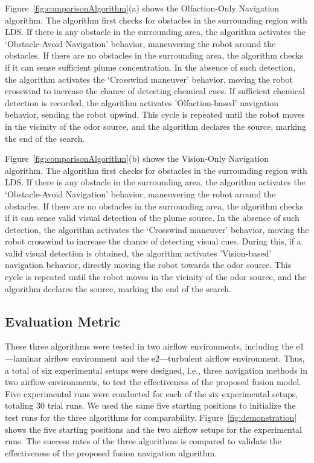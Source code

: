 Figure~\ref{fig:comparisonAlgorithm}(a) shows the Olfaction-Only Navigation algorithm. The algorithm first checks for obstacles in the surrounding region with LDS. If there is any obstacle in the surrounding area, the algorithm activates the `Obstacle-Avoid Navigation' behavior, maneuvering the robot around the obstacles. If there are no obstacles in the surrounding area, the algorithm checks if it can sense sufficient plume concentration. In the absence of such detection, the algorithm activates the `Crosswind maneuver' behavior, moving the robot crosswind to increase the chance of detecting chemical cues. If sufficient chemical detection is recorded, the algorithm activates 'Olfaction-based' navigation behavior, sending the robot upwind. This cycle is repeated until the robot moves in the vicinity of the odor source, and the algorithm declares the source, marking the end of the search.

Figure~\ref{fig:comparisonAlgorithm}(b) shows the Vision-Only Navigation algorithm. The algorithm first checks for obstacles in the surrounding region with LDS. If there is any obstacle in the surrounding area, the algorithm activates the `Obstacle-Avoid Navigation' behavior, maneuvering the robot around the obstacles. If there are no obstacles in the surrounding area, the algorithm checks if it can sense valid visual detection of the plume source. In the absence of such detection, the algorithm activates the `Crosswind maneuver' behavior, moving the robot crosswind to increase the chance of detecting visual cues. During this, if a valid visual detection is obtained, the algorithm activates 'Vision-based' navigation behavior, directly moving the robot towards the odor source. This cycle is repeated until the robot moves in the vicinity of the odor source, and the algorithm declares the source, marking the end of the search.

\subsection{Evaluation Metric}\label{subsec:fusionEvaluationMetric}
These three algorithms were tested in two airflow environments, including the e1---laminar airflow environment and the e2---turbulent airflow environment. Thus, a total of six experimental setups were designed, i.e., three navigation methods in two airflow environments, to test the effectiveness of the proposed fusion model. Five experimental runs were conducted for each of the six experimental setups, totaling 30 trial runs. We used the same five starting positions to initialize the test runs for the three algorithms for comparability. Figure~\ref{fig:demonstration} shows the five starting positions and the two airflow setups for the experimental runs. The success rates of the three algorithms is compared to validate the effectiveness of the proposed fusion navigation algorithm.



